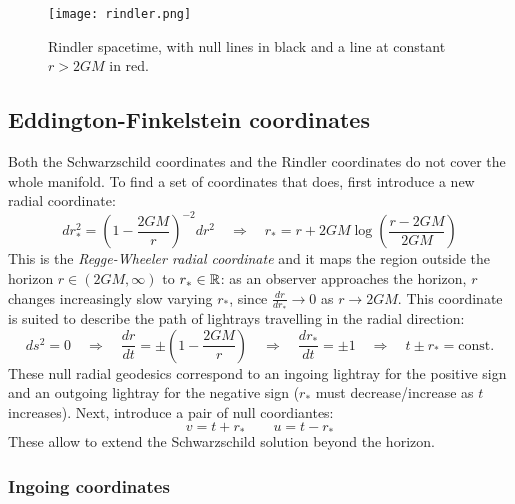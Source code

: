 \begin{figure}[b]
  \centering
  \texttt{[image: rindler.png]}
  \caption{Rindler spacetime, with null lines in black and a line at constant $ r > 2GM $ in red.}
  \label{rindler}
\end{figure}

\subsection{Eddington-Finkelstein coordinates}

Both the Schwarzschild coordinates and the Rindler coordinates do not cover the whole manifold. To find a set of coordinates that does, first introduce a new radial coordinate:
\begin{equation}
  dr_*^2 = \left( 1 - \frac{2GM}{r} \right)^{-2} dr^2
  \quad \Rightarrow \quad
  r_* = r + 2GM \log \left( \frac{r - 2GM}{2GM} \right)
  \label{eq:6.4}
\end{equation}
This is the \textit{Regge-Wheeler radial coordinate} and it maps the region outside the horizon $ r \in (2GM, \infty) $ to $ r_* \in \mathbb{R} $: as an observer approaches the horizon, $ r $ changes increasingly slow varying $ r_* $, since $ \frac{dr}{dr_*} \rightarrow 0 $ as $ r \rightarrow 2GM $. This coordinate is suited to describe the path of lightrays travelling in the radial direction:
\begin{equation*}
  ds^2 = 0
  \quad \Rightarrow \quad
  \frac{dr}{dt} = \pm \left( 1 - \frac{2GM}{r} \right)
  \quad \Rightarrow \quad
  \frac{dr_*}{dt} = \pm 1
  \quad \Rightarrow \quad
  t \pm r_* = \text{const.}
\end{equation*}
These null radial geodesics correspond to an ingoing lightray for the positive sign and an outgoing lightray for the negative sign ($ r_* $ must decrease/increase as $ t $ increases). Next, introduce a pair of null coordiantes:
\begin{equation}
  v = t + r_*
  \qquad
  u = t - r_*
  \label{eq:6.5}
\end{equation}
These allow to extend the Schwarzschild solution beyond the horizon.

\subsubsection{Ingoing coordinates}


